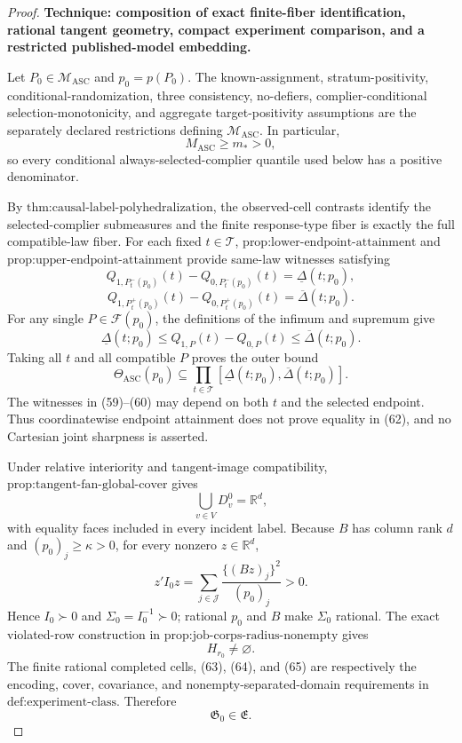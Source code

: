 \documentclass{article}
\begin{document}
\begin{proof}
\textbf{Technique: composition of exact finite-fiber identification, rational tangent geometry, compact experiment comparison, and a restricted published-model embedding.}

Let \(P_0\in\mathcal M_{\mathrm{ASC}}\) and \(p_0=p(P_0)\).  The known-assignment, stratum-positivity, conditional-randomization, three consistency, no-defiers, complier-conditional selection-monotonicity, and aggregate target-positivity assumptions are the separately declared restrictions defining \(\mathcal M_{\mathrm{ASC}}\).  In particular,
\[
 M_{\mathrm{ASC}}\ge m_*>0,
 \tag{58}
\]
so every conditional always-selected-complier quantile used below has a positive denominator.

By \(\text{thm:causal-label-polyhedralization}\), the observed-cell contrasts identify the selected-complier submeasures and the finite response-type fiber is exactly the full compatible-law fiber.  For each fixed \(t\in\mathcal T\), \(\text{prop:lower-endpoint-attainment}\) and \(\text{prop:upper-endpoint-attainment}\) provide same-law witnesses satisfying
\[
 Q_{1,P_t^-(p_0)}(t)-Q_{0,P_t^-(p_0)}(t)
 =\underline\Delta(t;p_0),
 \tag{59}
\]
\[
 Q_{1,P_t^+(p_0)}(t)-Q_{0,P_t^+(p_0)}(t)
 =\overline\Delta(t;p_0).
 \tag{60}
\]
For any single \(P\in\mathcal F(p_0)\), the definitions of the infimum and supremum give
\[
 \underline\Delta(t;p_0)
 \le Q_{1,P}(t)-Q_{0,P}(t)
 \le\overline\Delta(t;p_0).
 \tag{61}
\]
Taking all \(t\) and all compatible \(P\) proves the outer bound
\[
 \Theta_{\mathrm{ASC}}(p_0)
 \subseteq\prod_{t\in\mathcal T}
 [\underline\Delta(t;p_0),\overline\Delta(t;p_0)].
 \tag{62}
\]
The witnesses in (59)--(60) may depend on both \(t\) and the selected endpoint.  Thus coordinatewise endpoint attainment does not prove equality in (62), and no Cartesian joint sharpness is asserted.

Under relative interiority and tangent-image compatibility, \(\text{prop:tangent-fan-global-cover}\) gives
\[
 \bigcup_{v\in V}D_v^0=\mathbb R^d,
 \tag{63}
\]
with equality faces included in every incident label.  Because \(B\) has column rank \(d\) and \((p_0)_j\ge\kappa>0\), for every nonzero \(z\in\mathbb R^d\),
\[
 z'I_0z=\sum_{j\in\mathcal J}
 \frac{\{(Bz)_j\}^2}{(p_0)_j}>0.
 \tag{64}
\]
Hence \(I_0\succ0\) and \(\Sigma_0=I_0^{-1}\succ0\); rational \(p_0\) and \(B\) make \(\Sigma_0\) rational.  The exact violated-row construction in \(\text{prop:job-corps-radius-nonempty}\) gives
\[
 H_{r_0}\ne\varnothing.
 \tag{65}
\]
The finite rational completed cells, (63), (64), and (65) are respectively the encoding, cover, covariance, and nonempty-separated-domain requirements in \(\text{def:experiment-class}\).  Therefore
\[
 \mathfrak G_0\in\mathfrak E.
 \tag{66}
\]


\end{proof}
\end{document}

